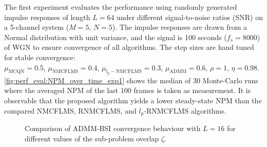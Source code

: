 \documentclass{article}
\begin{document}
The first experiment evaluates the performance using randomly generated impulse responses of length \(L=64\) under different signal-to-noise ratios (SNR) on a 5-channel system (\(M=5,\,N=5\)).
The impulse responses are drawn from a Normal distribution with unit variance, and the signal is 100 seconds (\(f_s=8000\)) of WGN to ensure convergence of all algorithms.
The step sizes are hand tuned for stable convergence: \(\mu_{\text{MCQN}}=0.5,\, \mu_{\text{NMCFLMS}}=0.4,\, \mu_{l_p-\text{NMCFLMS}}=0.3,\, \mu_{\text{ADMM}}=0.6,\, \rho=1,\,\eta=0.98 \).
\autoref{fig:perf_eval:NPM_over_time_exp1} shows the median of 30 Monte-Carlo runs where the averaged NPM of the last \(100\) frames is taken as measurement.
It is observable that the proposed algorithm yields a lower steady-state NPM than the compared NMCFLMS, RNMCFLMS, and \(l_p\)-RNMCFLMS algorithms.

\begin{figure}[t]
    \centering
    \hspace*{-0.2cm}
    \hspace*{-0.0cm}
    \vspace*{-0.2cm}
    \caption{Comparison of ADMM-BSI convergence behaviour with \(L\!=\!16\) for different values of the sub-problem overlap \(\zeta\).}
    \label{fig:perf_eval:NPM_over_time_exp2}
\end{figure}
\end{document}
